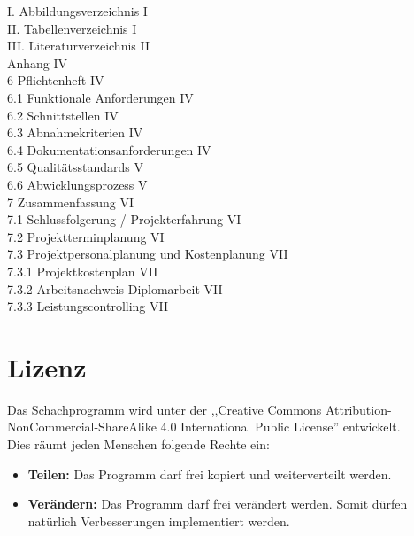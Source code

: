 \documentclass[12pt,a4paper]{article}
\begin{document}
{{{\clearpage\vfill\newpage{}\noindent%
	I. Abbildungsverzeichnis \dotfill I		\\
	II. Tabellenverzeichnis \dotfill I		\\
	III. Literaturverzeichnis \dotfill II		\\
	Anhang \dotfill IV				\\
	6 Pflichtenheft \dotfill IV			\\
	\phantom{11}6.1 Funktionale Anforderungen \dotfill IV	\\
	\phantom{11}6.2 Schnittstellen \dotfill IV			\\
	\phantom{11}6.3 Abnahmekriterien \dotfill IV		\\
	\phantom{11}6.4 Dokumentationsanforderungen \dotfill IV	\\
	\phantom{11}6.5 Qualitätsstandards \dotfill V		\\
	\phantom{11}6.6 Abwicklungsprozess \dotfill V		\\
	7 Zusammenfassung \dotfill VI			\\
	\phantom{11}7.1 Schlussfolgerung / Projekterfahrung \dotfill VI	\\
	\phantom{11}7.2 Projektterminplanung \dotfill VI		\\
	\phantom{11}7.3 Projektpersonalplanung und Kostenplanung \dotfill VII	\\
	\phantom{111}7.3.1 Projektkostenplan \dotfill VII		\\
	\phantom{111}7.3.2 Arbeitsnachweis Diplomarbeit \dotfill VII	\\
	\phantom{111}7.3.3 Leistungscontrolling \dotfill VII		\\
}
}	%



\clearpage\vfill\newpage{}

\section{Lizenz}
\label{SEC:licence}

Das Schachprogramm wird unter der ,,Creative Commons Attribution-NonCommercial-ShareAlike 4.0 International Public License'' entwickelt. \\
Dies räumt jeden Menschen folgende Rechte ein: 
\begin{itemize}
	\item{\textbf{Teilen:} Das Programm darf frei kopiert und weiterverteilt werden.}
	\item{\textbf{Verändern:} Das Programm darf frei verändert werden. Somit dürfen natürlich Verbesserungen implementiert werden.}
\end{itemize}

}
\end{document}
